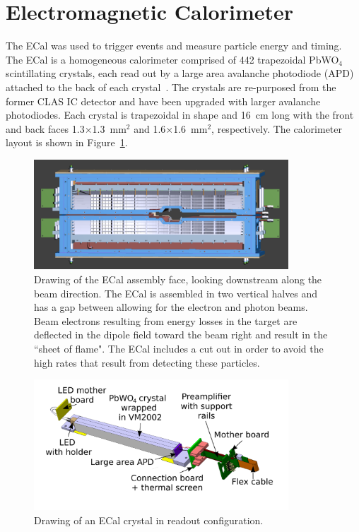 \section{Electromagnetic Calorimeter}
The ECal was used to trigger events and measure particle energy and timing. The ECal is a homogeneous calorimeter comprised of 442 trapezoidal PbWO$_4$ scintillating crystals, each read out by a large area avalanche photodiode (APD) attached to the back of each crystal~\cite{Balossino201789}. The crystals are re-purposed from the former CLAS IC detector and have been upgraded with larger avalanche photodiodes. Each crystal is trapezoidal in shape and 16~cm long with the front and back faces 1.3$\times$1.3~mm$^2$ and 1.6$\times$1.6~mm$^2$, respectively. The calorimeter layout is shown in Figure~\ref{Figure:ecalface}. 

\begin{figure}[h]
  \centering
      \includegraphics[width=0.85\textwidth]{pics/experiment/ecalface.png}
  \caption[Drawing of the ECal assembly face]{Drawing of the ECal assembly face, looking downstream along the beam direction. The ECal is assembled in two vertical halves and has a gap between allowing for the electron and photon beams. Beam electrons resulting from energy losses in the target are deflected in the dipole field toward the beam right and result in the ``sheet of flame". The ECal includes a cut out in order to avoid the high rates that result from detecting these particles.}
  \label{Figure:ecalface}
\end{figure}

\begin{figure}[h]
  \centering
      \includegraphics[width=0.85\textwidth]{pics/experiment/crystal.png}
  \caption[Single ECal module]{Drawing of an ECal crystal in readout configuration.}
  \label{Figure:crystal}
\end{figure}

